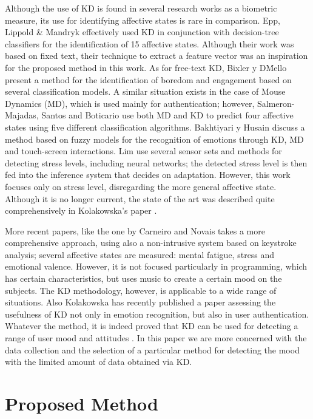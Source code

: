 \documentclass[a4paper,twoside]{article}
\begin{document}
Although the use of KD is found in several research works
as a biometric measure, its use for identifying affective states is rare in
comparison. Epp, Lippold \& Mandryk \cite{epp2011identifying} effectively used KD in conjunction
with decision-tree classifiers for the identification of 15 affective states.
Although their work was based on fixed text, their technique to extract a feature
vector was an inspiration for the proposed method in this work. As for free-text
KD, Bixler y D\'Mello \cite{bixler2013detecting} present a method for the identification of boredom
and engagement based on several classification models. A similar situation exists in the case of Mouse Dynamics (MD), which is used mainly for authentication; however, Salmeron-Majadas, Santos
and Boticario \cite{salmeron2014exploring} use both MD and KD to predict four affective states using
five different classification algorithms. Bakhtiyari y Husain \cite{bakhtiyari2014fuzzy} discuss a
method based on fuzzy models for the recognition of emotions through KD, MD and
touch-screen interactions. Lim \cite{lim2017detecting} use several
sensor sets and methods for detecting stress levels, including neural
networks; the detected stress level is then fed into the inference
system that decides on adaptation. However, this work focuses only on
stress level, disregarding the more general affective state. Although
it is no longer current, the state of the art was described quite
comprehensively in Kolakowska's paper \cite{kolakowska2013review}.

More recent papers, like the one by Carneiro and Novais \cite{CARNEIRO2017171} takes a
more comprehensive approach, using also a non-intrusive system based
on keystroke analysis; several affective states are measured: mental
fatigue, stress and emotional valence. However, it is not focused
particularly in programming, which has certain characteristics, but
uses music to create a certain mood on the subjects. The KD
methodology, however, is applicable to a wide range of
situations. Also Kolakowska has recently published a paper
\cite{Kolakowska2018} assessing the usefulness of KD not only in
emotion recognition, but also in user authentication. Whatever the
method, it is indeed proved that KD can be used for detecting a range
of user mood and attitudes \cite{wrobel2018applicability}. In this
paper we are more concerned with the data collection and the selection
of a particular method for detecting the mood with the limited amount
of data obtained via KD. 


\section{Proposed Method}
\label{sec:method}
\end{document}
